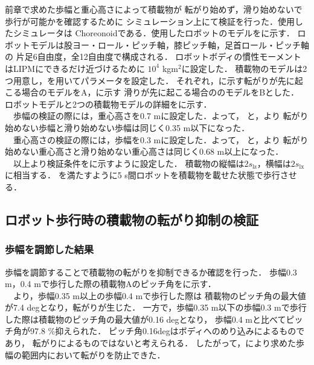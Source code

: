   前章で求めた歩幅と重心高さによって積載物が
  転がり始めず，滑り始めないで歩行が可能かを確認するために
シミュレーション上にて検証を行った．使用したシミュレータは
Choreonoidである．使用したロボットのモデルをに示す．
ロボットモデルは股ヨー・ロール・ピッチ軸，膝ピッチ軸，足首ロール・ピッチ軸の
片足6自由度，全12自由度で構成される．
ロボットボディの慣性モーメントはLIPMにできるだけ近づけるために
$10^4$ kg${\mathrm{m}^2}$に設定した．
積載物のモデルは2つ用意し，を用いてパラメータを設定した．
それぞれ，に示す転がりが先に起こる場合のモデルをA，に示す
滑りが先に起こる場合ののモデルをBとした．
ロボットモデルと2つの積載物モデルの詳細をに示す．\\
　歩幅の検証の際には，重心高さを0.7 mに設定した．よって，
と，より
転がり始めない歩幅と滑り始めない歩幅は同じく0.35 m以下になった．\\
　重心高さの検証の際には，歩幅を0.3 mに設定した．よって，
と，より
転がり始めない重心高さと滑り始めない重心高さは同じく0.68 m以上になった．\\
　以上より検証条件をに示すように設定した．
積載物の縦幅は$2{s}_{\mathrm{lz}}$，横幅は$2{s}_{\mathrm{lx}}$に相当する．
を満たすように5 s間ロボットを積載物を載せた状態で歩行させる．
\subsection{ロボット歩行時の積載物の転がり抑制の検証}
\subsubsection{歩幅を調節した結果}
\label {4.1.1}
歩幅を調節することで積載物の転がりを抑制できるか確認を行った．
歩幅0.3 m，0.4 mで歩行した際の積載物Aのピッチ角をに示す．\\
　より，歩幅0.35 m以上の歩幅0.4 mで歩行した際は
積載物のピッチ角の最大値が7.4 degとなり，転がりが生じた．
一方で，歩幅0.35 m以下の歩幅0.3 mで歩行した際は積載物のピッチ角の最大値が0.16 degとなり，
歩幅0.4 mと比べてピッチ角が97.8 \%抑えられた．
ピッチ角0.16degはボディへのめり込みによるものであり，
転がりによるものではないと考えられる．
したがって，により求めた歩幅の範囲内において転がりを防止できた．\\
